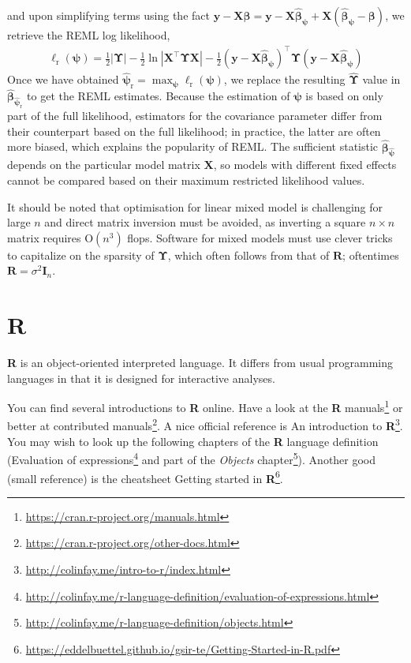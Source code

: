 \documentclass[
  11pt,
  letterpaper,
]{book}
\renewcommand{\href}[2]{#2\footnote{\url{#1}}}
\theoremstyle{definition}
\theoremstyle{definition}
\theoremstyle{definition}
\theoremstyle{remark}
\begin{document}
and upon simplifying terms using the fact \(\boldsymbol{y} - \mathbf{X}\boldsymbol{\beta} = \boldsymbol{y} - \mathbf{X}\widehat{\boldsymbol{\beta}}_{\boldsymbol{\psi}} + \mathbf{X}(\widehat{\boldsymbol{\beta}}_{\boldsymbol{\psi}} - \boldsymbol{\beta})\), we retrieve the REML log likelihood,
\begin{align*}
\ell_{\mathrm{r}}(\boldsymbol{\psi}) = \frac{1}{2}|\boldsymbol{\Upsilon}| - \frac{1}{2} \ln \left|\mathbf{X}^\top\boldsymbol{\Upsilon}\mathbf{X}\right|  - \frac{1}{2}(\boldsymbol{y} -\mathbf{X}\widehat{\boldsymbol{\beta}}_{\boldsymbol{\psi}})^\top \boldsymbol{\Upsilon}(\boldsymbol{y} -\mathbf{X}\widehat{\boldsymbol{\beta}}_{\boldsymbol{\psi}})
\end{align*}
Once we have obtained \(\widehat{\boldsymbol{\psi}}_{\mathrm{r}}= \max_{\boldsymbol{\psi}} \ell_{\mathrm{r}}(\boldsymbol{\psi})\), we replace the resulting \(\widehat{\boldsymbol{\Upsilon}}\) value in
\(\widehat{\boldsymbol{\beta}}_{\widehat{\boldsymbol{\psi}}_{\mathrm{r}}}\)
to get the REML estimates.
Because the estimation of \(\boldsymbol{\psi}\) is based on only part of the full likelihood, estimators for the covariance parameter differ from their counterpart based on the full likelihood; in practice, the latter are often more biased, which explains the popularity of REML. The sufficient statistic \(\widehat{\boldsymbol{\beta}}_{\widehat{\boldsymbol{\psi}}}\) depends on the particular model matrix \(\mathbf{X}\), so models with different fixed effects cannot be compared based on their maximum restricted likelihood values.

It should be noted that optimisation for linear mixed model is challenging for large \(n\) and direct matrix inversion must be avoided, as inverting a square \(n \times n\) matrix requires \(\mathrm{O}(n^3)\) flops. Software for mixed models must use clever tricks to capitalize on the sparsity of \(\boldsymbol{\Upsilon}\), which often follows from that of \(\mathbf{R}\); oftentimes \(\mathbf{R} = \sigma^2 \mathbf{I}_n\).

\hypertarget{r}{%
\chapter{\texorpdfstring{\textbf{R}}{R}}\label{r}}

\textbf{R} is an object-oriented interpreted language. It differs from usual programming languages in that it is designed for interactive analyses.

You can find several introductions to \textbf{R} online. Have a look at the \href{https://cran.r-project.org/manuals.html}{\textbf{R} manuals} or better at \href{https://cran.r-project.org/other-docs.html}{contributed manuals}. A nice official reference is \href{http://colinfay.me/intro-to-r/index.html}{An introduction to \textbf{R}}.
You may wish to look up the following chapters of the \textbf{R} language definition (\href{http://colinfay.me/r-language-definition/evaluation-of-expressions.html}{Evaluation of expressions} and part of the \href{http://colinfay.me/r-language-definition/objects.html}{\emph{Objects} chapter}). Another good (small reference) is the cheatsheet \href{https://eddelbuettel.github.io/gsir-te/Getting-Started-in-R.pdf}{Getting started in \textbf{R}}.
\end{document}

